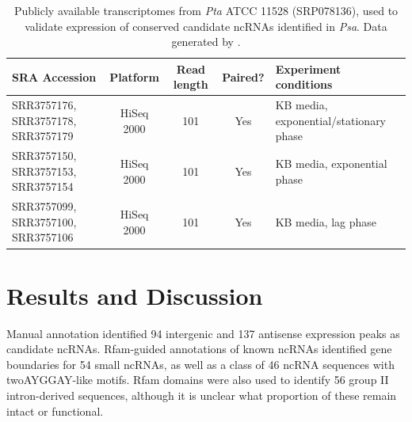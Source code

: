 \begin{table}[H]
    \footnotesize
    \centering
    \begin{tabular}{p{2.5cm}cccp{6cm}}\toprule
SRA Accession &  Platform & Read length & Paired? & Experiment conditions\\\midrule
SRR3757176, SRR3757178, SRR3757179 & HiSeq 2000 & 101 & Yes & KB media, exponential/stationary phase \\
SRR3757150, SRR3757153, SRR3757154 & HiSeq 2000 & 101 & Yes & KB media, exponential phase \\
SRR3757099, SRR3757100, SRR3757106 & HiSeq 2000 & 101 & Yes & KB media, lag phase \\
\bottomrule
    \end{tabular}
    \caption[\textit{Pta} transcriptomes used to validate candidate ncRNA expression (SRP078136)]{Publicly available transcriptomes from \textit{Pta} ATCC 11528 (SRP078136), used to validate expression of conserved candidate ncRNAs identified in \textit{Psa}. Data generated by \cite{Cheng2017-ja}. }
    \label{tab:tabaci_transcriptomes_2}
\end{table}

\section{Results and Discussion}

Manual annotation identified 94 intergenic and 137 antisense expression peaks as candidate ncRNAs. Rfam-guided annotations of known ncRNAs identified gene boundaries for 54 small ncRNAs, as well as a class of 46 ncRNA sequences with twoAYGGAY-like motifs. Rfam domains were also used to identify 56 group II intron-derived sequences, although it is unclear what proportion of these remain intact or functional.

